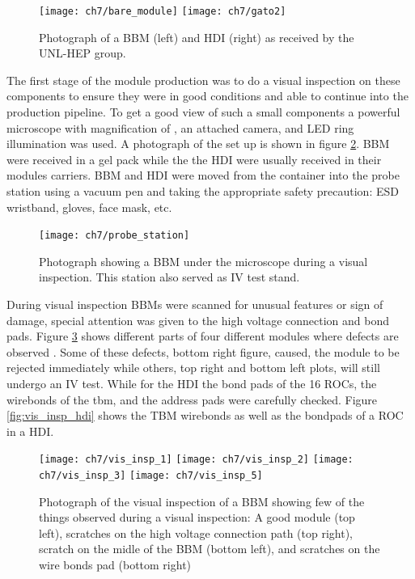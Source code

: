 \begin{figure}[!h]
\centering
\texttt{[image: ch7/bare\_module]}
\texttt{[image: ch7/gato2]}
\caption[Photograph of a BBM and HDI.]{Photograph of a BBM (left) and HDI (right) as received by the UNL-HEP group.}\label{fig:bbmyhdi}
\end{figure}

The first stage of the module production was to do a visual inspection on these components to ensure they were in good conditions and able to continue into the production pipeline. {} To get a good view of such a small components a powerful microscope with magnification of {}, an attached camera, and LED ring illumination was used. A photograph of the set up is shown in figure \ref{fig:probe_station}. BBM were received in a gel pack while the the HDI were usually received in their modules carriers. BBM and HDI were moved from the container into the probe station using a vacuum pen and taking the appropriate safety precaution: ESD wristband, gloves, face mask, etc.

\begin{figure}[!h]
\centering
\texttt{[image: ch7/probe\_station]}
\caption[Photograph of the visual inspection and IV test station.]{{} Photograph showing a BBM under the microscope during a visual inspection. This station also served as IV test stand.}\label{fig:probe_station}
\end{figure}

During visual inspection BBMs were scanned for unusual features or sign of damage, special attention was given to the high voltage connection and bond pads. Figure \ref{fig:vis_insp_bbm} shows different parts of four different modules where defects are observed {}. Some of these defects, bottom right figure, caused, the module to be rejected immediately while others, top right and bottom left plots, will still undergo an IV test. While for the HDI the bond pads of the 16 ROCs, the wirebonds of the tbm, and the address pads were carefully checked. Figure \ref{fig:vis_insp_hdi} shows the TBM wirebonds as well as the bondpads of a ROC in a HDI.

\begin{figure}[!h]
  \centering
  \texttt{[image: ch7/vis\_insp\_1]}
  \texttt{[image: ch7/vis\_insp\_2]}
  \texttt{[image: ch7/vis\_insp\_3]}
  \texttt{[image: ch7/vis\_insp\_5]}
  \caption[Visual inspection of a bare module.]{Photograph of the visual inspection of a BBM showing few of the things observed during a visual inspection: A good module (top left), scratches on the high voltage connection path (top right), scratch on the midle of the BBM (bottom left), and scratches on the wire bonds pad (bottom right)}\label{fig:vis_insp_bbm}
\end{figure}

